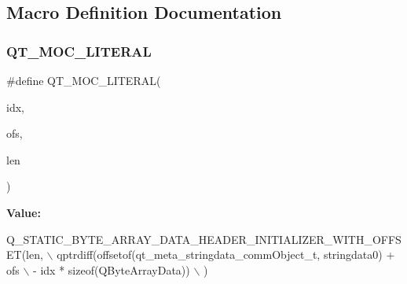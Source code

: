 \subsection{Macro Definition Documentation}
\mbox{\label{_release_2moc__communication_8cpp_a75bb9482d242cde0a06c9dbdc6b83abe}} 
\subsubsection{Q\+T\+\_\+\+M\+O\+C\+\_\+\+L\+I\+T\+E\+R\+AL}
{\footnotesize\ttfamily \#define Q\+T\+\_\+\+M\+O\+C\+\_\+\+L\+I\+T\+E\+R\+AL(\begin{DoxyParamCaption}\item[{}]{idx,  }\item[{}]{ofs,  }\item[{}]{len }\end{DoxyParamCaption})}

{\bfseries Value\+:}
\begin{DoxyCode}
Q\_STATIC\_BYTE\_ARRAY\_DATA\_HEADER\_INITIALIZER\_WITH\_OFFSET(len, \(\backslash\)
    qptrdiff(offsetof(qt_meta_stringdata_commObject_t, stringdata0) + ofs \(\backslash\)
        - idx * \textcolor{keyword}{sizeof}(QByteArrayData)) \(\backslash\)
    )
\end{DoxyCode}
